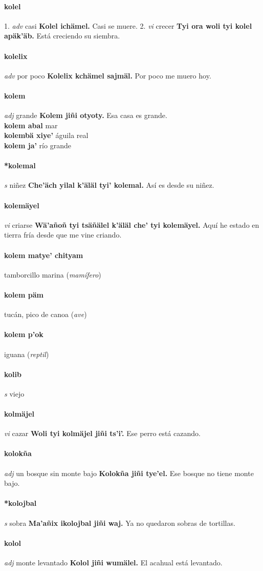 \documentclass{scrbook}
\newcommand{\entry}[1]{\paragraph{#1}}
\newcommand{\onedefinition}[1]{#1.}
\newcommand{\partofspeech}[1]{\textit{#1}}
\newcommand{\spanishtranslation}[1]{#1}
\newcommand{\clarification}[1]{(\textit{#1})}
\newcommand{\cholexample}[1]{\textbf{#1}}
\newcommand{\exampletranslation}[1]{#1}
\newcommand{\secondaryentry}[1]{\\\textbf{#1}}
\newcommand{\secondtranslation}[1]{#1}
\begin{document}
\begin{multicols}{2}
\entry{kolel}
\onedefinition{1}
\partofspeech{adv}
\spanishtranslation{casi}
\cholexample{Kolel ichämel.}
\exampletranslation{Casi se muere.}
\onedefinition{2}
\partofspeech{vi}
\spanishtranslation{crecer}
\cholexample{Tyi ora woli tyi kolel apäk'äb.}
\exampletranslation{Está creciendo su siembra.}

\entry{kolelix}
\partofspeech{adv}
\spanishtranslation{por poco}
\cholexample{Kolelix kchämel sajmäl.}
\exampletranslation{Por poco me muero hoy.}

\entry{kolem}
\partofspeech{adj}
\spanishtranslation{grande}
\cholexample{Kolem jiñi otyoty.}
\exampletranslation{Esa casa es grande.}
\secondaryentry{kolem abal}
\secondtranslation{mar}
\secondaryentry{kolembä xiye'}
\secondtranslation{águila real}
\secondaryentry{kolem ja'}
\secondtranslation{río grande}

\entry{*kolemal}
\partofspeech{s}
\spanishtranslation{niñez}
\cholexample{Che'äch yilal k'äläl tyi' kolemal.}
\exampletranslation{Así es desde su niñez.}

\entry{kolemäyel}
\partofspeech{vi}
\spanishtranslation{criarse}
\cholexample{Wä'añoñ tyi tsäñälel k'äläl che' tyi kolemäyel.}
\exampletranslation{Aquí he estado en tierra fría desde que me vine criando.}

\entry{kolem matye' chityam}
\spanishtranslation{tamborcillo}
\spanishtranslation{marina}
\clarification{mamífero}

\entry{kolem päm}
\spanishtranslation{tucán, pico de canoa}
\clarification{ave}

\entry{kolem p'ok}
\spanishtranslation{iguana}
\clarification{reptil}

\entry{kolib}
\partofspeech{s}
\spanishtranslation{viejo}

\entry{kolmäjel}
\partofspeech{vi}
\spanishtranslation{cazar}
\cholexample{Woli tyi kolmäjel jiñi ts'i'.}
\exampletranslation{Ese perro está cazando.}

\entry{kolokña}
\partofspeech{adj}
\spanishtranslation{un bosque sin monte bajo}
\cholexample{Kolokña jiñi tye'el.}
\exampletranslation{Ese bosque no tiene monte bajo.}

\entry{*kolojbal}
\partofspeech{s}
\spanishtranslation{sobra}
\cholexample{Ma'añix ikolojbal jiñi waj.}
\exampletranslation{Ya no quedaron sobras de tortillas.}

\entry{kolol}
\partofspeech{adj}
\spanishtranslation{monte levantado}
\cholexample{Kolol jiñi wumälel.}
\exampletranslation{El acahual está levantado.}


\end{multicols}
\end{document}
